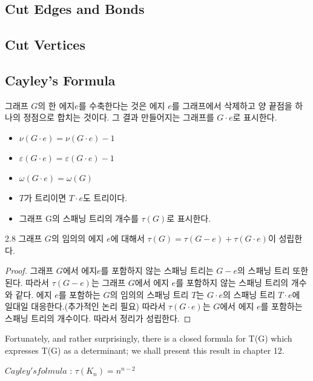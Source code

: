 \subsection{Cut Edges and Bonds}

\subsection{Cut Vertices}

\subsection{Cayley's Formula}
\begin{dfn}[contract]
    그래프 $G$의 한 에지$e$를 수축한다는 것은 에지 $e$를 그래프에서 삭제하고 양 끝점을 하나의 정점으로 합치는 것이다. 그 결과 만들어지는 그래프를 $G \cdot e$로 표시한다.
    \begin{itemize}
        \item $\nu(G \cdot e) = \nu(G \cdot e) - 1$
        \item $\varepsilon(G \cdot e) = \varepsilon(G \cdot e)-1$
        \item $\omega(G \cdot e) = \omega(G)$
        \item  $T$가 트리이면 $T \cdot e$도 트리이다.
        \item 그래프 G의 스패닝 트리의 개수를 $\tau(G)$로 표시한다.
    \end{itemize}
\end{dfn}

\begin{theorem}
    2.8 그래프 $G$의 임의의 에지 $e$에 대해서 $\tau(G) =\tau(G-e) + \tau(G \cdot e)$이 성립한다.
\end{theorem}

\begin{proof}
    그래프 $G$에서 에지$e$를 포함하지 않는 스패닝 트리는 $G-e$의 스패닝 트리 또한 된다.
    따라서 $\tau(G-e)$는 그래프 $G$에서 에지 $e$를 포함하지 않는 스패닝 트리의 개수와 같다.
    에지 $e$를 포함하는 $G$의 임의의 스패닝 트리 $T$는 $G \cdot e$의 스패닝 트리 $T \cdot e$에 일대일 대응한다.(추가적인 논리 필요) 따라서 $\tau(G \cdot e)$는 $G$에서 에지 $e$를 포함하는 스패닝 트리의 개수이다. 따라서 정리가 성립한다.
\end{proof}


Fortunately, and rather surprisingly, there is a closed formula for T(G) which expresses T(G) as a determinant; 
we shall present this result in chapter 12.


\begin{theorem}
    $Cayley's folmula$ : $\tau(K_n)= n^{n-2}$
\end{theorem}

